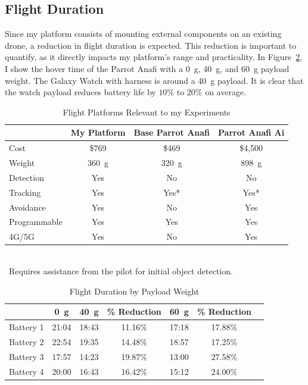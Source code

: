 \subsection{Flight Duration}
\label{sec:flightduration}

Since my platform consists of mounting external components on an
existing drone, a reduction in flight duration is expected. This
reduction is important to quantify, as it directly impacts my
platform's range and practicality. In Figure~\ref{fig:battery}, I
show the hover time of the Parrot Anafi with a 0~g, 40~g, and 60~g
payload weight. The Galaxy Watch with harness is around a 40~g
payload. It is clear that the watch payload reduces battery life by $10\%$ to $20\%$ on average.

\begin{table}
	\centering
	\begin{tabular}{|l|c|c|c|}
		\hline
		& My Platform & Base Parrot Anafi & Parrot Anafi Ai \\
		\hline
		Cost & \$769 & \$469 & \$4,500 \\
		\hline
		Weight & 360~g & 320~g & 898~g \\ 
		\hline
		Detection & \cellcolor{green!30}Yes & \cellcolor{red!30}No & \cellcolor{red!30}No \\
		\hline
		Tracking & \cellcolor{green!30}Yes & \cellcolor{yellow!30}Yes* & \cellcolor{yellow!30}Yes*\\
		\hline
		Avoidance & \cellcolor{green!30}Yes & \cellcolor{red!30}No & \cellcolor{green!30}Yes\\
		\hline
		Programmable & \cellcolor{green!30}Yes & \cellcolor{green!30}Yes & \cellcolor{green!30}Yes\\
		\hline
		4G/5G & \cellcolor{green!30}Yes & \cellcolor{red!30}No & \cellcolor{green!30}Yes\\
		\hline
	\end{tabular}
	\begin{captext}
            \\[0.1cm]
		\centering
		\small *~Requires assistance from the pilot for initial object detection.
	\end{captext}
	\caption{Flight Platforms Relevant to my Experiments}
	\label{fig:featurematrix}
\end{table}

\begin{table}
\centering
\begin{tabular}{|l|c|c|c|c|c|c|}
\hline
&0~g &40~g &\cellcolor[HTML]{FF9470}\% Reduction 
 &60~g &\cellcolor[HTML]{FF9470}\% Reduction \\
 \hline
Battery 1 & 21:04 & 18:43 &11.16\% & 17:18 &17.88\% \\
 \hline
Battery 2 & 22:54 & 19:35 &14.48\% & 18:57 &17.25\% \\
 \hline
Battery 3 & 17:57 & 14:23 &19.87\% & 13:00 &27.58\% \\
 \hline
Battery 4 & 20:00 & 16:43 &16.42\% & 15:12 &24.00\% \\
 \hline
\end{tabular}
\caption{Flight Duration by Payload Weight}
\label{fig:battery}
\end{table}

